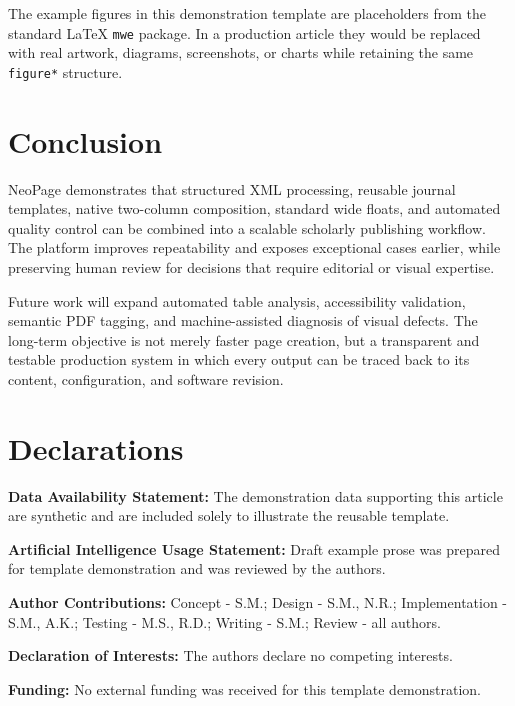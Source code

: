 \documentclass{tnqjournal}
\begin{document}
The example figures in this demonstration template are placeholders from the standard \LaTeX{} \texttt{mwe} package. In a production article they would be replaced with real artwork, diagrams, screenshots, or charts while retaining the same \texttt{figure*} structure.

\section{Conclusion}
NeoPage demonstrates that structured XML processing, reusable journal templates, native two-column composition, standard wide floats, and automated quality control can be combined into a scalable scholarly publishing workflow. The platform improves repeatability and exposes exceptional cases earlier, while preserving human review for decisions that require editorial or visual expertise.

Future work will expand automated table analysis, accessibility validation, semantic PDF tagging, and machine-assisted diagnosis of visual defects. The long-term objective is not merely faster page creation, but a transparent and testable production system in which every output can be traced back to its content, configuration, and software revision.

\section*{Declarations}
\textcolor{urpblue}{\textbf{Data Availability Statement:}} The demonstration data supporting this article are synthetic and are included solely to illustrate the reusable template.

\textcolor{urpblue}{\textbf{Artificial Intelligence Usage Statement:}} Draft example prose was prepared for template demonstration and was reviewed by the authors.

\textcolor{urpblue}{\textbf{Author Contributions:}} Concept - S.M.; Design - S.M., N.R.; Implementation - S.M., A.K.; Testing - M.S., R.D.; Writing - S.M.; Review - all authors.

\textcolor{urpblue}{\textbf{Declaration of Interests:}} The authors declare no competing interests.

\textcolor{urpblue}{\textbf{Funding:}} No external funding was received for this template demonstration.
\end{document}
